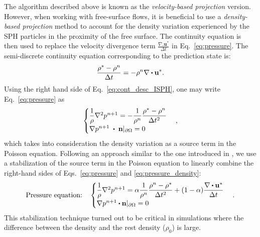 The algorithm described above is known as the \textit{velocity-based projection} version. However, when working with free-surface flows, it is beneficial to use a \textit{density-based projection} method \cite{asai2012stabilized} to account for the density variation experienced by the SPH particles in the proximity of the free surface. The continuity equation is then used to replace the velocity divergence term $\frac{\nabla.\mathbf{u}^*}{\Delta t}$ in Eq.~\ref{eq:pressure}. The semi-discrete continuity equation corresponding to the prediction state is:
\begin{equation}\label{eq:cont_desc_ISPH}
\dfrac{\rho^*-\rho^n}{\Delta t}=-\rho^n \nabla \bigcdot  \mathbf{u}^*.
\end{equation}
Using the right hand side of Eq.~\ref{eq:cont_desc_ISPH}, one may write  Eq.~\ref{eq:pressure} as
\begin{equation}\label{eq:pressure_density}
\begin{cases}
\dfrac{1}{\rho} \nabla^2 p^{n+1}=-\dfrac{1}{\rho^n}\dfrac{\rho^*-\rho^n}{\Delta t^2}\\
\nabla p^{n+1}\;\bigcdot \;\mathbf{n}|_{\partial \Omega}=0
\end{cases},
\end{equation}
which takes into consideration the density variation as a source term in the Poisson equation. Following an approach similar to the one introduced in \cite{asai2012stabilized}, we use a stabilization of the source term in the Poisson equation to linearly combine the right-hand sides of Eqs.~\ref{eq:pressure} and \ref{eq:pressure_density}:
\begin{equation*}
\text{Pressure equation:} \quad
\begin{cases}
\dfrac{1}{\rho} \nabla^2 p^{n+1}=\alpha\dfrac{1}{\rho^n}\dfrac{\rho^n-\rho^*}{\Delta t^2} + (1-\alpha) \dfrac{\nabla \bigcdot \mathbf{u}^*}{\Delta t}\\
\nabla p^{n+1}\bigcdot \mathbf{n}|_{\partial \Omega}=0
\end{cases}.
\end{equation*}
This stabilization technique turned out to be critical in simulations where the difference between the density and the rest density ($\rho_0$) is large.

